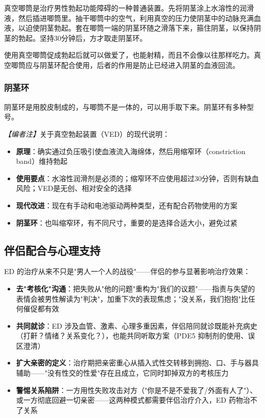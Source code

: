 真空唧筒是治疗男性勃起功能障碍的一种普通装置。先将阴茎涂上水溶性的润滑液，然后插进唧筒里。抽干唧筒中的空气，利用真空的压力使阴茎中的动脉充满血液，以迫使阴茎勃起。套在唧筒一端的阴茎环随之滑落下来，箍住阴茎，以保持阴茎的勃起。坚持30分钟后，方才取走阴茎环。

使用真空唧筒促成勃起后就可以做爱了，也能射精，而且不会像以往那样吃力。真空唧筒应与阴茎环配合使用，后者的作用是防止已经进入阴茎的血液回流。

\subsubsection{阴茎环}

阴茎环是用胶皮制成的，与唧筒不是一体的，可以用手取下来。阴茎环有多种型号。

\noindent\textit{【编者注】}关于真空勃起装置（VED）的现代说明：
\begin{itemize}
	\item \textbf{原理}：确实通过负压吸引使血液流入海绵体，然后用缩窄环（constriction band）维持勃起
	\item \textbf{使用要点}：水溶性润滑剂是必须的；缩窄环不应使用超过30分钟，否则有缺血风险；VED是无创、相对安全的选择
	\item \textbf{现代改进}：现在有手动和电池驱动两种类型，还有配合药物使用的方案
	\item \textbf{阴茎环}：也叫缩窄环，有不同尺寸，重要的是选择合适大小，避免过紧
\end{itemize}
\subsection{伴侣配合与心理支持}


ED 的治疗从来不只是"男人一个人的战役"——伴侣的参与显著影响治疗效果：

\begin{itemize}
	\item \textbf{去"考核化"沟通}：把失败从"他的问题"重构为"我们的议题"——指责与失望的表情会被男性解读为"判决"，加重下次的表现焦虑；"没关系，我们抱抱"比任何催促都有效
	\item \textbf{共同就诊}：ED 涉及血管、激素、心理多重因素，伴侣陪同就诊既能补充病史（打鼾？情绪？关系变化？），也能共同听取方案（PDE5 抑制剂的使用、误区澄清）
	\item \textbf{扩大亲密的定义}：治疗期把亲密重心从插入式性交转移到拥抱、口、手与器具辅助——"没有性交的性爱"存在且成立，它同时卸掉双方的考核压力
	\item \textbf{警惕关系陷阱}：一方用性失败攻击对方（"你是不是不爱我了/外面有人了"）、或一方彻底回避一切亲密——这两种模式都需要伴侣治疗介入，ED 药物治不了关系
\end{itemize}


